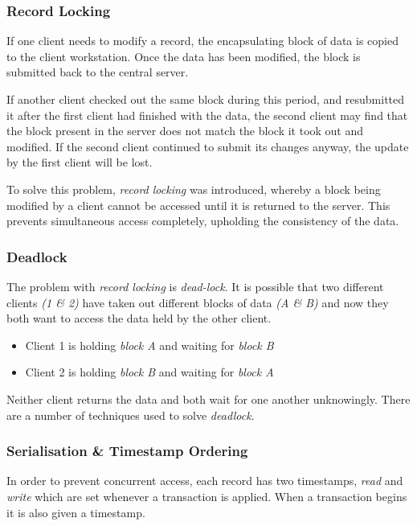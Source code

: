 \documentclass[10pt]{article}
\begin{document}
\subsubsection{Record Locking}
\label{sec:orgd4921bd}

If one client needs to modify a record, the encapsulating block of data is copied to the client workstation. Once the data has been modified, the block is submitted back to the central server.

If another client checked out the same block during this period, and resubmitted it after the first client had finished with the data, the second client may find that the block present in the server does not match the block it took out and modified. If the second client continued to submit its changes anyway, the update by the first client will be lost.

To solve this problem, \emph{record locking} was introduced, whereby a block being modified by a client cannot be accessed until it is returned to the server. This prevents simultaneous access completely, upholding the consistency of the data.

\subsubsection{Deadlock}
\label{sec:org25ea23c}

The problem with \emph{record locking} is \emph{dead-lock}. It is possible that two different clients \emph{(1 \& 2)} have taken out different blocks of data \emph{(A \& B)} and now they both want to access the data held by the other client.

\begin{itemize}
\item Client 1 is holding \emph{block A} and waiting for \emph{block B}
\item Client 2 is holding \emph{block B} and waiting for \emph{block A}
\end{itemize}

Neither client returns the data and both wait for one another unknowingly. There are a number of techniques used to solve \emph{deadlock}.

\subsubsection{Serialisation \& Timestamp Ordering}
\label{sec:org5362714}

In order to prevent concurrent access, each record has two timestamps, \emph{read} and \emph{write} which are set whenever a transaction is applied. When a transaction begins it is also given a timestamp.
\end{document}
